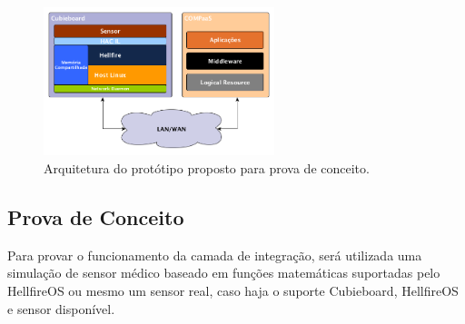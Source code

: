 \begin{figure}[H]
	\centering
		\includegraphics[width=0.6\textwidth]{fig/HAC_IL.png}
	\caption{Arquitetura do protótipo proposto para prova de conceito.}
	\label{fig:HAC_IL}
\end{figure}

\subsection{Prova de Conceito}
Para provar o funcionamento da camada de integração, será utilizada uma
simulação de sensor médico baseado em funções matemáticas suportadas pelo HellfireOS
ou mesmo um sensor real, caso haja o suporte Cubieboard, HellfireOS e sensor disponível.

